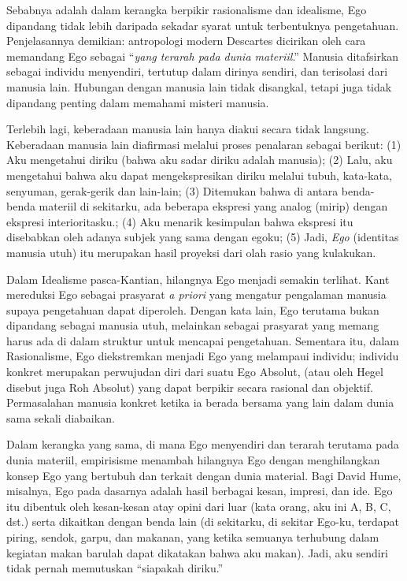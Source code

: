 \documentclass[11pt,twoside,a5paper,openany]{memoir}
\begin{document}
Sebabnya adalah dalam kerangka berpikir rasionalisme dan idealisme, Ego
dipandang tidak lebih daripada sekadar syarat untuk terbentuknya
pengetahuan. Penjelasannya demikian: antropologi modern Descartes
dicirikan oleh cara memandang Ego sebagai ``\emph{yang terarah pada
dunia materiil}.'' Manusia ditafsirkan sebagai individu menyendiri,
tertutup dalam dirinya sendiri, dan terisolasi dari manusia lain.
Hubungan dengan manusia lain tidak disangkal, tetapi juga tidak
dipandang penting dalam memahami misteri manusia.

Terlebih lagi, keberadaan manusia lain hanya diakui secara tidak
langsung. Keberadaan manusia lain diafirmasi melalui proses penalaran
sebagai berikut: (1) Aku mengetahui diriku (bahwa aku sadar diriku
adalah manusia); (2) Lalu, aku mengetahui bahwa aku dapat
mengekspresikan diriku melalui tubuh, kata-kata, senyuman, gerak-gerik
dan lain-lain; (3) Ditemukan bahwa di antara benda-benda materiil di
sekitarku, ada beberapa ekspresi yang analog (mirip) dengan ekspresi
interioritasku.; (4) Aku menarik kesimpulan bahwa ekspresi itu
disebabkan oleh adanya subjek yang sama dengan egoku; (5) Jadi,
\emph{Ego} (identitas manusia utuh) itu merupakan hasil proyeksi dari
olah rasio yang kulakukan.

Dalam Idealisme pasca-Kantian, hilangnya Ego menjadi semakin terlihat.
Kant mereduksi Ego sebagai prasyarat \emph{a priori} yang mengatur
pengalaman manusia supaya pengetahuan dapat diperoleh. Dengan kata lain,
Ego terutama bukan dipandang sebagai manusia utuh, melainkan sebagai
prasyarat yang memang harus ada di dalam struktur untuk mencapai
pengetahuan. Sementara itu, dalam Rasionalisme, Ego diekstremkan menjadi
Ego yang melampaui individu; individu konkret merupakan perwujudan diri
dari suatu Ego Absolut, (atau oleh Hegel disebut juga Roh Absolut) yang
dapat berpikir secara rasional dan objektif. Permasalahan manusia
konkret ketika ia berada bersama yang lain dalam dunia sama sekali
diabaikan.

Dalam kerangka yang sama, di mana Ego menyendiri dan terarah terutama
pada dunia materiil, empirisisme menambah hilangnya Ego dengan
menghilangkan konsep Ego yang bertubuh dan terkait dengan dunia
material. Bagi David Hume, misalnya, Ego pada dasarnya adalah hasil
berbagai kesan, impresi, dan ide. Ego itu dibentuk oleh kesan-kesan atay
opini dari luar (kata orang, aku ini A, B, C, dst.) serta dikaitkan
dengan benda lain (di sekitarku, di sekitar Ego-ku, terdapat piring,
sendok, garpu, dan makanan, yang ketika semuanya terhubung dalam
kegiatan makan barulah dapat dikatakan bahwa aku makan). Jadi, aku
sendiri tidak pernah memutuskan ``siapakah diriku.''
\end{document}
